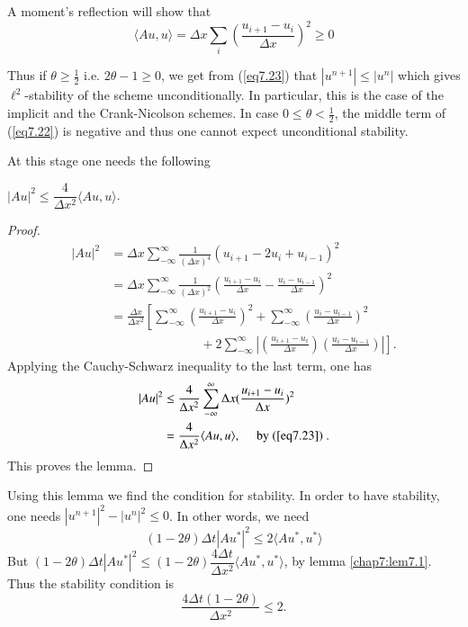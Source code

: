 \begin{exam}
A moment's reflection will show that 
\begin{equation*}
\langle Au, u \rangle  = \Delta x \sum\limits_i \left(\frac{u_{i+1} -
  u_i}{\Delta x}\right)^2 \geq 0\tag{7.24}\label{eq7.24}
\end{equation*}

Thus if $\theta \geq \frac{1}{2} $ i.e. $2\theta -1 \geq 0$, we get
from (\ref{eq7.23}) that $|u^{n+1}| \leq |u^n|$ which gives $\ell^2$-stability
of the scheme unconditionally. In particular, this is the case of the
implicit and the Crank-Nicolson schemes. In case $0\leq \theta <
\frac{1}{2}$, the middle term of (\ref{eq7.22}) is negative and thus one
cannot expect unconditional stability.

At this stage one needs the following
\end{exam}

\begin{lem}\label{chap7:lem7.1}
$|Au|^2 \leq \dfrac{4}{\Delta x^2} \langle Au, u\rangle$.
\end{lem}

\begin{proof}
\begin{align*}
|Au|^2 & = \Delta x \sum\limits^\infty_{-\infty} \frac{1}{(\Delta x)^4} (u_{i+1} - 2u_i + u_{i-1})^2\\
& = \Delta x \sum\limits^\infty_{-\infty} \frac{1}{(\Delta x)^2}
\left(\frac{u_{i+1} - u_i}{\Delta x}  - \frac{u_i - u_{i-1}}{\Delta
  x}\right)^2 \\ 
& = \frac{\Delta x}{\Delta x^2} \left[\sum\limits^\infty_{-\infty}
  \left(\frac{u_{i+1} - u_i}{\Delta  x}\right)^2 + \sum\limits^\infty_{-\infty}
  \left(\frac{u_i -u_{i-1}}{\Delta x}\right)^2\right.\\ 
  & \left.\hspace{3cm}+ 2 \sum\limits^\infty_{-\infty}
  \left| \left(\frac{u_{i+1} - u_i}{\Delta x}\right) \left(\frac{u_i
    -u_{i-1}}{\Delta x}\right) \right|  \right].  
\end{align*}
Applying the Cauchy-Schwarz inequality to the last term, one has 
\begin{align*}
|Au|^2  & \leq \frac{4}{\Delta x^2} \sum^\infty_{-\infty} \Delta x
(\frac{u_{i+1} - u_i}{\Delta  x})^2 \\ 
& = \frac{4}{\Delta x^2} \langle Au, u\rangle , \quad \text{ by
  (\ref{eq7.23}) }. 
\end{align*}\pageoriginale  
This proves the lemma.
\end{proof}

Using this lemma we find the condition for stability. In order to have stability, one needs $|u^{n+1}|^2 - |u^n|^2 \leq 0$. In other words, we need
$$
(1- 2\theta) \Delta  t |A u^*|^2 \leq 2 \langle Au^*, u^*\rangle 
$$
But $(1-2\theta) \Delta t |Au^*|^2 \leq (1-2\theta) \dfrac{4\Delta
  t}{\Delta x^2} \langle Au^*, u^*\rangle $, by lemma
\ref{chap7:lem7.1}. Thus the stability condition is 
\begin{equation*}
\frac{4\Delta t (1-2\theta)}{\Delta x^2} \leq 2. \tag{7.25}\label{eq7.25}
\end{equation*}

